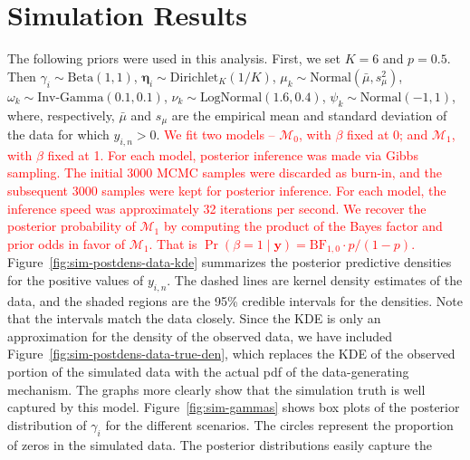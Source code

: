 \documentclass[12pt]{article} %
\newcommand{\Normal}{\text{Normal}}
\newcommand{\Beta}{\text{Beta}}
\newcommand{\InvGamma}{\text{Inv-Gamma}}
\newcommand{\Dirichlet}{\text{Dirichlet}}
\newcommand{\LogNormal}{\text{LogNormal}}
\newcommand{\true}{\text{TRUE}}
\newcommand{\alert}[1]{\textcolor{red}{#1}}
\begin{document}
\section{Simulation Results}\label{sec:sim-results}
The following priors were used in this analysis. First, we set $K=6$ and
$p=0.5$. Then $\gamma_i\sim\Beta(1, 1)$, $\bm\eta_i\sim\Dirichlet_K(1/K)$,
$\mu_k\sim\Normal(\bar{\mu}, s_\mu^2)$, $\omega_k\sim\InvGamma(0.1, 0.1)$,
$\nu_k\sim\LogNormal(1.6, 0.4)$, $\psi_k\sim\Normal(-1, 1)$, where,
respectively, $\bar{\mu}$ and $s_\mu$ are the empirical mean and standard
deviation of the data for which $y_{i,n} > 0$.
%
\alert{
We fit two models -- $\mathcal{M}_0$, with $\beta$ fixed at 0; and
$\mathcal{M}_1$, with $\beta$ fixed at 1. For each model, posterior inference
was made via Gibbs sampling. The initial 3000 MCMC samples were discarded as
burn-in, and the subsequent 3000 samples were kept for posterior inference.
For each model, the inference speed was approximately 32 iterations per
second. We recover the posterior probability of $\mathcal{M}_1$ by computing
the product of the Bayes factor and prior odds in favor of $\mathcal{M}_1$.
That is $\Pr(\beta=1 \mid \bm y) = \text{BF}_{1,0} \cdot p/(1-p)$.
}
%
%
Figure~\ref{fig:sim-postdens-data-kde} summarizes the posterior predictive
densities for the positive values of $y_{i,n}$. The dashed lines are kernel
density estimates of the data, and the shaded regions are the 95\% credible
intervals for the densities. Note that the intervals match the data closely.
%
Since the KDE is only an approximation for the density of the observed data,
we have included Figure~\ref{fig:sim-postdens-data-true-den}, which replaces
the KDE of the observed portion of the simulated data with the actual pdf of
the data-generating mechanism. The graphs more clearly show that the simulation
truth is well captured by this model. 
%
Figure~\ref{fig:sim-gammas} shows box plots of the posterior distribution of
$\gamma_i$ for the different scenarios. The circles represent the proportion
of zeros in the simulated data. The posterior distributions easily capture the
\end{document}
